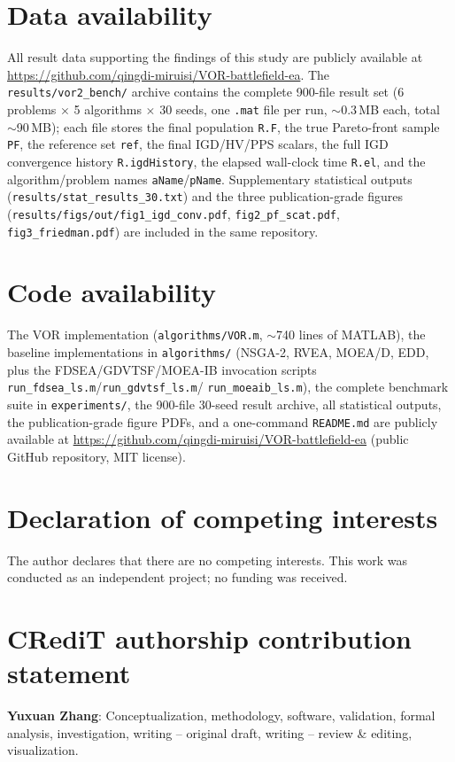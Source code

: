 \documentclass[preprint,12pt]{elsarticle}
\begin{document}
\section*{Data availability}
All result data supporting the findings of this study are publicly
available at \url{https://github.com/qingdi-miruisi/VOR-battlefield-ea}.
The \texttt{results/vor2\_bench/} archive contains the complete
900-file result set (6 problems $\times$ 5 algorithms $\times$ 30 seeds,
one \texttt{.mat} file per run, $\sim$0.3\,MB each, total
$\sim$90\,MB); each file stores the final population \texttt{R.F}, the
true Pareto-front sample \texttt{PF}, the reference set \texttt{ref},
the final IGD/HV/PPS scalars, the full IGD convergence history
\texttt{R.igdHistory}, the elapsed wall-clock time \texttt{R.el}, and
the algorithm/problem names \texttt{aName}/\texttt{pName}.
Supplementary statistical outputs (\texttt{results/stat\_results\_30.txt})
and the three publication-grade figures
(\texttt{results/figs/out/fig1\_igd\_conv.pdf},
\texttt{fig2\_pf\_scat.pdf}, \texttt{fig3\_friedman.pdf}) are
included in the same repository.

\section*{Code availability}
The \textsc{VOR} implementation (\texttt{algorithms/VOR.m}, $\sim$740 lines
of MATLAB), the baseline implementations in \texttt{algorithms/}
(\textsc{NSGA-2}, \textsc{RVEA}, \textsc{MOEA/D}, \textsc{EDD}, plus the
\textsc{FDSEA}/\textsc{GDVTSF}/\textsc{MOEA-IB} invocation scripts
\texttt{run\_fdsea\_ls.m}/\texttt{run\_gdvtsf\_ls.m}/
\texttt{run\_moeaib\_ls.m}), the complete benchmark suite in
\texttt{experiments/}, the 900-file 30-seed result archive, all
statistical outputs, the publication-grade figure PDFs, and a one-command
\texttt{README.md} are publicly available at
\url{https://github.com/qingdi-miruisi/VOR-battlefield-ea}
(public GitHub repository, MIT license).

\section*{Declaration of competing interests}
The author declares that there are no competing interests. This work
was conducted as an independent project; no funding was received.

\section*{CRediT authorship contribution statement}
\textbf{Yuxuan Zhang}: Conceptualization, methodology, software,
validation, formal analysis, investigation, writing -- original draft,
writing -- review \& editing, visualization.
\end{document}
